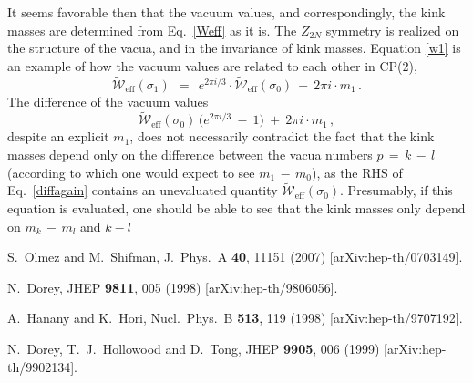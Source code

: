 \documentclass[12pt]{article}
\def\beq{\begin{equation}}
\def\eeq{\end{equation}}
\newcommand{\mc}[1]{\mathcal{#1}}
\newcommand{\ww}{\tilde{\mc{W}}{}_\text{eff}}
\begin{document}
	It seems favorable then that the vacuum values, and correspondingly, the kink
	masses are determined from Eq.~\eqref{Weff} as it is. 
	The $ Z_{2N} $ symmetry is realized on the structure of the vacua, and 
	in the invariance of kink masses.
	Equation \eqref{w1} is an example of how the vacuum values are related to each other
	in CP(2),
\beq
\label{w1again}
	\ww (\sigma_1) ~~=~~ e^{2\pi i /3 } \cdot \ww (\sigma_0) ~+~ 2\pi i \cdot m_1\,.
\eeq
	The difference of the vacuum values
\beq
\label{diffagain}
	\ww (\sigma_0) \, \Big( e^{2\pi i /3} ~-~ 1 \Big)  ~+~  2\pi i \cdot m_1\,,
\eeq
	despite an explicit $ m_1 $, does not necessarily contradict the fact that 
	the kink masses depend only on the difference between the vacua numbers 
	$ p \,=\, k \,-\, l $ \cite{Dorey:1999zk}
	(according to which one would expect to see $ m_1 \,-\, m_0 $), 
	as the RHS of Eq.~\eqref{diffagain} contains an unevaluated quantity $ \ww (\sigma_0) $.
	Presumably, if this equation is evaluated, one should be able to see that the kink
	masses only depend on $ m_k \,-\, m_l $ and $ k - l $

\begin{thebibliography}{99}
  S.~Olmez and M.~Shifman,
  J.\ Phys.\ A  {\bf 40}, 11151 (2007)
  [arXiv:hep-th/0703149].

  N.~Dorey,
  JHEP {\bf 9811}, 005 (1998)
  [arXiv:hep-th/9806056].

  A.~Hanany and K.~Hori,
  Nucl.\ Phys.\  B {\bf 513}, 119 (1998)
  [arXiv:hep-th/9707192].

  N.~Dorey, T.~J.~Hollowood and D.~Tong,
  JHEP {\bf 9905}, 006 (1999)
  [arXiv:hep-th/9902134].

\end{thebibliography}
\end{document}
